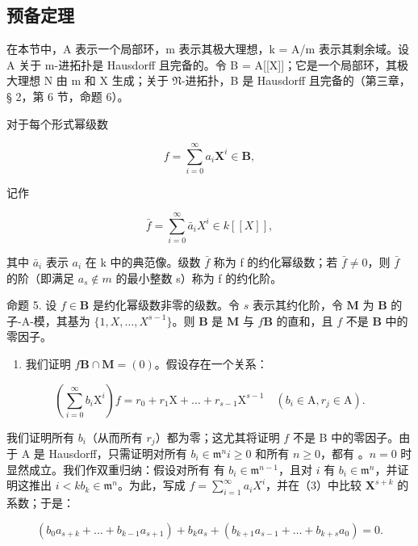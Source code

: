 \subsection{预备定理}

在本节中，A 表示一个局部环，m 表示其极大理想，k = A/m 表示其剩余域。设 A 关于 m-进拓扑是 Hausdorff 且完备的。令 B = A{[}{[}X{]}{]}；它是一个局部环，其极大理想 N 由 m 和 X 生成；关于 \(\mathfrak{N}\)-进拓扑，B 是 Hausdorff 且完备的（第三章，§ 2，第 6 节，命题 6）。

对于每个形式幂级数

\[
f = \sum_ {i = 0} ^ {\infty} a _ {i} \mathbf {X} ^ {i} \in \mathbf {B},
\]

记作

\[
\bar {f} = \sum_ {i = 0} ^ {\infty} \bar {a} _ {i} X ^ {i} \in k [ [ X ] ],
\]

其中 \(\bar{a}_{i}\) 表示 \(a_{i}\) 在 k 中的典范像。级数 \(\bar{f}\) 称为 f 的约化幂级数；若 \(\bar{f} \neq 0\)，则 \(\bar{f}\) 的阶（即满足 \(a_{s} \notin m\) 的最小整数 s）称为 f 的约化阶。

命题 5. 设 \(f \in \mathbf{B}\) 是约化幂级数非零的级数。令 \(s\) 表示其约化阶，令 \(\mathbf{M}\) 为 \(\mathbf{B}\) 的子-A-模，其基为 \(\{1, X, \ldots, X^{s-1}\}\)。则 \(\mathbf{B}\) 是 \(\mathbf{M}\) 与 \(f\mathbf{B}\) 的直和，且 \(f\) 不是 \(\mathbf{B}\) 中的零因子。

\begin{enumerate}
\def\labelenumi{(\alph{enumi})}
\tightlist
\item
  我们证明 \(f\mathbf{B} \cap \mathbf{M} = (0)\)。假设存在一个关系：
\end{enumerate}

\[
\left(\sum_ {i = 0} ^ {\infty} b _ {i} \mathrm{X} ^ {i}\right) f = r _ {0} + r _ {1} \mathrm{X} + \dots + r _ {s - 1} \mathrm{X} ^ {s - 1} \quad (b _ {i} \in \mathrm{A}, r _ {j} \in \mathrm{A}).\tag{3}
\]

我们证明所有 \(b_{i}\)（从而所有 \(r_{j}\)）都为零；这尤其将证明 \(f\) 不是 B 中的零因子。由于 A 是 Hausdorff，只需证明对所有 \(b_{i} \in \mathfrak{m}^{n}\)\(i \geqslant 0\) 和所有 \(n \geqslant 0\)，都有 。\(n = 0\) 时显然成立。我们作双重归纳：假设对所有  有 \(b_{i} \in \mathfrak{m}^{n-1}\)，且对 \(i\) 有 \(b_{i} \in \mathfrak{m}^{n}\)，并证明这推出 \(i < k\)\(b_{k} \in \mathfrak{m}^{n}\)。为此，写成 \(f = \sum_{i=1}^{\infty} a_{i} X^{i}\)，并在（3）中比较 \(\mathbf{X}^{s+k}\) 的系数；于是：

\[
\left(b _ {0} a _ {s + k} + \dots + b _ {k - 1} a _ {s + 1}\right) + b _ {k} a _ {s} + \left(b _ {k + 1} a _ {s - 1} + \dots + b _ {k + s} a _ {0}\right) = 0.\tag{4}
\]

